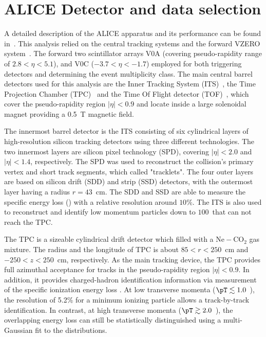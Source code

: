 
\section{ALICE Detector and data selection}%
\label{sec:Detector}

A detailed description of the ALICE apparatus and its performance can be found in~\cite{Collaboration_2008, Abelev:2014ffa}.
This analysis relied on the central tracking systems and the forward VZERO system~\cite{collaboration_2013}.
The forward two scintillator arrays V0A (covering pseudo-rapidity range of $2.8 < \eta < 5.1$), and V0C ($-3.7 < \eta < -1.7$) employed for both triggering detectors and determining the event multiplicity class.
The main central barrel detectors used for this analysis are the Inner Tracking System (ITS)~\cite{collaboration_2010}, the Time Projection Chamber (TPC)~\cite{ALME2010316} and the Time Of Flight detector (TOF)~\cite{PIDwithTOF, TOF, TOFResults, Carnesecchi:2018oss}, which cover the pseudo-rapidity region $|\eta| < 0.9$ and locate inside a large solenoidal magnet providing a 0.5~T magnetic field.

The innermost barrel detector is the ITS consisting of six cylindrical layers of high-resolution silicon tracking detectors using three different technologies.
The two innermost layers are silicon pixel technology (SPD), covering $|\eta| < 2.0$ and $|\eta| < 1.4$, respectively.
The SPD was used to reconstruct the collision's primary vertex and short track segments, which called "tracklets".
The four outer layers are based on silicon drift (SDD) and strip (SSD) detectors, with the outermost layer having a radius $r = 43$~cm.
The SDD and SSD are able to measure the specific energy loss (\dEdx) with a relative resolution around $10\%$.
The ITS is also used to reconstruct and identify low momentum particles down to $100$~\MeVc that can not reach the TPC.

The TPC is a sizeable cylindrical drift detector which filled with a $\mathrm{Ne-CO_{2}}$ gas mixture.
The radius and the longitude of TPC is about $85 < r < 250 $~cm and $-250 < z < 250 $~cm, respectively.
As the main tracking device, the TPC provides full azimuthal acceptance for tracks in the pseudo-rapidity region $|\eta| < 0.9$.
In addition, it provides charged-hadron identification information via measurement of the specific ionization energy loss \dEdx.
At low transverse momenta ($\pT \lesssim 1.0$~\GeVc), the \dEdx resolution of 5.2\% for a minimum ionizing particle allows a track-by-track identification. In contrast, at high transverse momenta ($\pT \gtrsim 2.0$~\GeVc), the overlapping energy loss can still be statistically distinguished using a multi-Gaussian fit to the \dEdx distributions.

